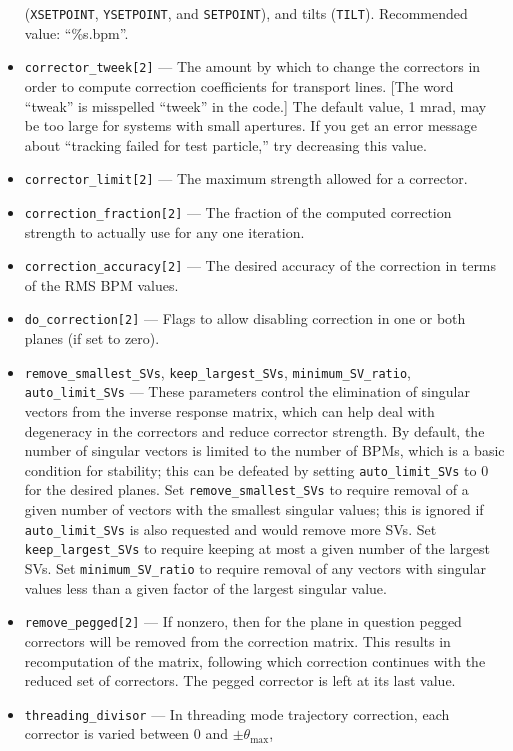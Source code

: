 \documentclass[11pt]{article}
\begin{document}
\begin{itemize}
  (\verb|XSETPOINT|, \verb|YSETPOINT|, and \verb|SETPOINT|), and tilts (\verb|TILT|).
  Recommended value: ``\%s.bpm''.
\item \verb|corrector_tweek[2]| --- The amount by which to change the correctors in order to compute correction coefficients for
transport lines.
[The word ``tweak'' is misspelled ``tweek'' in the code.]   The default value, 1 mrad, may be too large for systems with
small apertures.  If you get an error message about ``tracking failed for test particle,'' try decreasing this value.
\item \verb|corrector_limit[2]| --- The maximum strength allowed for a corrector.
\item \verb|correction_fraction[2]| --- The fraction of the computed correction strength to actually use for any one iteration.
\item \verb|correction_accuracy[2]| --- The desired accuracy of the correction in terms of the RMS BPM values.
\item \verb|do_correction[2]| --- Flags to allow disabling correction in one or both planes (if set to zero).
\item \verb|remove_smallest_SVs|, \verb|keep_largest_SVs|, \verb|minimum_SV_ratio|, \verb|auto_limit_SVs| --- These parameters control the elimination of
  singular vectors from the inverse response matrix, which can help deal with degeneracy in the correctors and reduce corrector strength.
  By default, the number of singular vectors is limited to the number of BPMs, which is a basic condition for stability; this can be defeated by
  setting \verb|auto_limit_SVs| to 0 for the desired planes.  Set \verb|remove_smallest_SVs| to require removal of a given number of
  vectors with the smallest singular values; this is ignored if \verb|auto_limit_SVs| is also requested and would remove more SVs. 
  Set \verb|keep_largest_SVs| to require keeping at most a given number of the largest SVs.
  Set \verb|minimum_SV_ratio| to require removal of any vectors with singular values less than a given factor of the largest singular value.
\item \verb|remove_pegged[2]| --- If nonzero, then for the plane in question pegged correctors will be removed from the correction matrix.
  This results in recomputation of the matrix, following which correction continues with the reduced set of correctors.
  The pegged corrector is left at its last value.
\item \verb|threading_divisor| --- In threading mode trajectory correction, each corrector is varied between 0 and $\pm{\theta_{\textrm{max}}}$, 

\end{itemize}
\end{document}
